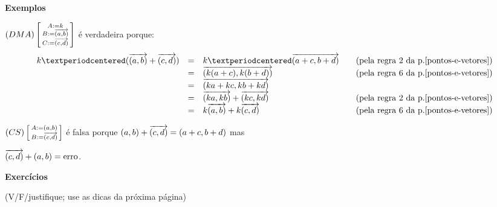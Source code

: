 \documentclass[oneside]{book}
\begin{document}
\msk

{\bf Exemplos}

$(DMA)\left[\begin {smallmatrix}A:=k \\ B:={\overrightarrow{(a,b)}} \\ C:={\overrightarrow{(c,d)}}\end{smallmatrix}\right]$ é verdadeira porque:
%
$$\def\pr#1{\text{(pela regra #1 da p.\pageref{pontos-e-vetores})}}
  \begin{array}{rclcl}
  k·(\vab+\vcd) &=& k·\VEC{a+c,b+d}           && \pr2 \\
                &=& \VEC{k(a+c),k(b+d)}       && \pr6 \\
                &=& \VEC{ka+kc,kb+kd}         && \\
                &=& \VEC{ka,kb} + \VEC{kc,kd} && \pr2 \\
                &=& k\vab + k\vcd             && \pr6 \\
  \end{array}
$$

$(CS)\left[\begin {smallmatrix}A:=(a,b) \\ B:={\overrightarrow{(c,d)}}\end{smallmatrix}\right]$ é falsa porque $(a,b) + {\overrightarrow{(c,d)}} =
  (a+c,b+d)$ mas

${\overrightarrow{(c,d)}}+(a,b) = \text{erro}$.

\msk

{\bf Exercícios}

(V/F/justifique; use as dicas da próxima página)
\end{document}
